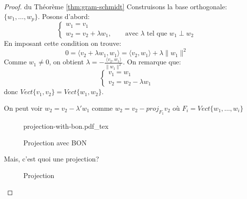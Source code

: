 \documentclass[a4paper]{article}
\newcommand{\scalair}[1]{\langle #1 \rangle}
\newcommand{\incfig}[1]{%
    \def\svgwidth{\columnwidth}
    {#1.pdf_tex}
}
\begin{document}
\begin{proof} du Théorème \ref{thm:gram-schmidt}
    Construisons la base orthogonale: $\{w_1, \ldots, w_p\}$. Posons d'abord:
    \[
    \begin{cases}
        w_1 = v_1\\
        w_2 = v_2 + \lambda w_1, \qquad \text{avec } \lambda \text{ tel que } w_1 \perp w_2
    \end{cases}
    \] 
    En imposant cette condition on trouve:
    \[
        0 = \scalair{v_2 + \lambda w_1, w_1} = \scalair{v_2, w_1} + \lambda \|w_1\|^2
    \] 
    Comme $w_1 \neq 0$, on obtient $\lambda = - \frac{\scalair{v_2, w_1}}{\|w_1\|^2}$. On remarque que:
    \[
    \begin{cases}
        v_1 = w_1\\
        v_2 = w_2 - \lambda w_1
    \end{cases}
    \] 
    donc $Vect\{v_1, v_2\} = Vect\{w_1, w_2\}$.
    \par
    On peut voir $w_2 = v_2 - \lambda' w_1 $ comme $w_2 = v_2 - proj_{F_1}v_2$ où $F_i = Vect\{w_1, \ldots, w_i\}$
    \begin{figure}[ht]
        \centering
        \incfig{projection-with-bon}
        \caption{Projection avec BON}
        \label{fig:projection-with-bon}
    \end{figure}
    \par
    Mais, c'est quoi une projection?
\begin{figure}[H]
   \centering 
{}
\caption{Projection}
\label{pic:projection}
\end{figure}


\end{proof}
\end{document}

